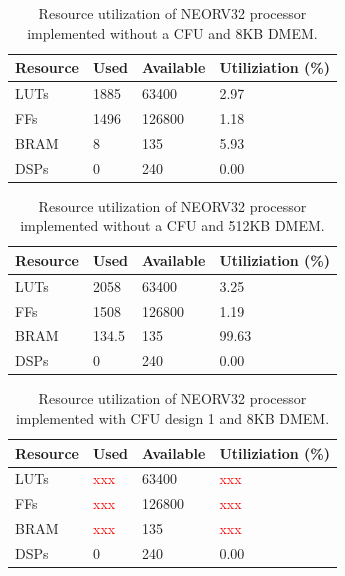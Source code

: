 \begin{table}[H]
\centering
\caption{Resource utilization of NEORV32 processor implemented without a CFU and 8KB DMEM.}
\begin{tabular}{|l|l|l|l|}
\hline
Resource & Used & Available & Utiliziation (\%) \\ \hline
LUTs     & 1885 & 63400     & 2.97              \\ \hline
FFs      & 1496 & 126800    & 1.18              \\ \hline
BRAM     & 8    & 135       & 5.93              \\ \hline
DSPs     & 0    & 240       & 0.00              \\ \hline
\end{tabular}
\label{tab:}
\end{table}


\begin{table}[H]
\centering
\caption{Resource utilization of NEORV32 processor implemented without a CFU and 512KB DMEM.}
\begin{tabular}{|l|l|l|l|}
\hline
Resource & Used & Available & Utiliziation (\%) \\ \hline
LUTs     & 2058 & 63400     & 3.25              \\ \hline
FFs      & 1508 & 126800    & 1.19              \\ \hline
BRAM     & 134.5    & 135       & 99.63              \\ \hline
DSPs     & 0    & 240       & 0.00              \\ \hline
\end{tabular}
\label{tab:}
\end{table}


\begin{table}[H]
\centering
\caption{Resource utilization of NEORV32 processor implemented with CFU design 1 and 8KB DMEM.}
\begin{tabular}{|l|l|l|l|}
\hline
Resource & Used & Available & Utiliziation (\%) \\ \hline
LUTs     & \textcolor{red}{xxx} & 63400     & \textcolor{red}{xxx}              \\ \hline
FFs      & \textcolor{red}{xxx} & 126800    & \textcolor{red}{xxx}              \\ \hline
BRAM     & \textcolor{red}{xxx}    & 135       & \textcolor{red}{xxx}              \\ \hline
DSPs     & 0    & 240       & 0.00              \\ \hline
\end{tabular}
\label{tab:}
\end{table}


